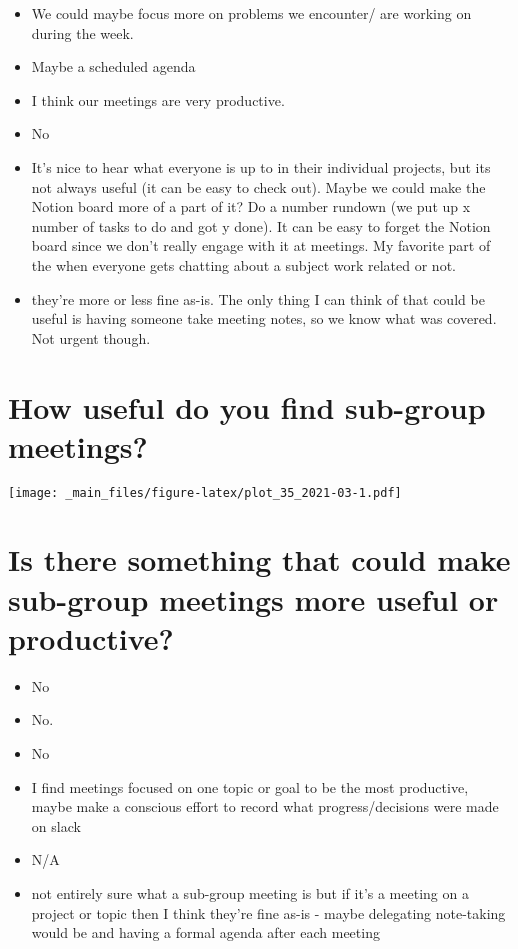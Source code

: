 \documentclass[
]{book}
\providecommand{\tightlist}{%
  \setlength{\itemsep}{0pt}\setlength{\parskip}{0pt}}
\begin{document}
\begin{itemize}
\tightlist
\item
  We could maybe focus more on problems we encounter/ are working on during the week.
\item
  Maybe a scheduled agenda
\item
  I think our meetings are very productive.
\item
  No
\item
  It's nice to hear what everyone is up to in their individual projects, but its not always useful (it can be easy to check out). Maybe we could make the Notion board more of a part of it? Do a number rundown (we put up x number of tasks to do and got y done). It can be easy to forget the Notion board since we don't really engage with it at meetings. My favorite part of the when everyone gets chatting about a subject work related or not.
\item
  they're more or less fine as-is. The only thing I can think of that could be useful is having someone take meeting notes, so we know what was covered. Not urgent though.
\end{itemize}

\hypertarget{how-useful-do-you-find-sub-group-meetings-1}{%
\section{How useful do you find sub-group meetings?}\label{how-useful-do-you-find-sub-group-meetings-1}}

\texttt{[image: \_main\_files/figure-latex/plot\_35\_2021-03-1.pdf]}

\hypertarget{is-there-something-that-could-make-sub-group-meetings-more-useful-or-productive-1}{%
\section{Is there something that could make sub-group meetings more useful or productive?}\label{is-there-something-that-could-make-sub-group-meetings-more-useful-or-productive-1}}

\begin{itemize}
\tightlist
\item
  No
\item
  No.
\item
  No
\item
  I find meetings focused on one topic or goal to be the most productive, maybe make a conscious effort to record what progress/decisions were made on slack
\item
  N/A
\item
  not entirely sure what a sub-group meeting is but if it's a meeting on a project or topic then I think they're fine as-is - maybe delegating note-taking would be and having a formal agenda after each meeting
\end{itemize}
\end{document}
